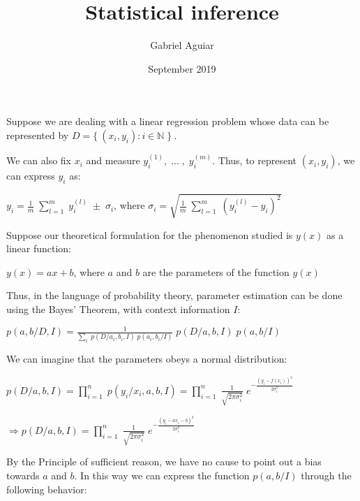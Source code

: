 \documentclass{article}
\title{Statistical inference}
\author{Gabriel Aguiar}
\date{September 2019}
\begin{document}
\maketitle

Suppose we are dealing with a linear regression problem whose data can be represented by $D = \{\ (x_{i},y_{i}) : i \in \mathbb{N} \; \}\ $.

We can also fix $x_{i}$ and measure $y_{i}^{(1)}, \; ... \; , \; y_{i}^{(m)}$. Thus, to represent $(x_{i},y_{i})$, we can express $y_{i}$ as:

\hfill

$y_{i} = \frac{1}{m} \; \sum\limits_{l = 1}^{m} \; y_{i}^{(l)} \; \pm \; \sigma_{i}$, where $\sigma_{i} = \sqrt{\frac{1}{m} \; \sum\limits_{l = 1}^{m} \; (y_{i}^{(l)} - y_{i})^{2}}$

\hfill

Suppose our theoretical formulation for the phenomenon studied is $y(x)$ as a linear function:

\hfill

$y(x) = ax + b$, where $a$ and $b$ are the parameters of the function $y(x)$

\hfill

Thus, in the language of probability theory, parameter estimation can be done using the Bayes' Theorem, with context information $I$:

\hfill

$p(a,b/D,I) = \frac{1}{\sum\limits_{i} \; p(D/a_{i},b_{i},I) \; p(a_{i},b_{i}/I)} \; p(D/a,b,I) \; p(a,b/I)$

\hfill

We can imagine that the parameters obeys a normal distribution:

\hfill

$p(D/a,b,I) = \prod\limits_{i = 1}^{n} \; p(y_{i}/x_{i},a,b,I) = \prod\limits_{i = 1}^{n} \; \frac{1}{\sqrt{2 \pi \sigma_{i}^{2}}} \; e^{-\frac{(y_{i} - f(x_{i}))^{2}}{2 \sigma_{i}^{2}}}$

\hfill

$\Rightarrow p(D/a,b,I) = \prod\limits_{i = 1}^{n} \; \frac{1}{\sqrt{2 \pi \sigma_{i}^{2}}} \; e^{-\frac{(y_{i} - ax_{i} - b)^{2}}{2 \sigma_{i}^{2}}}$

\hfill

By the Principle of sufficient reason, we have no cause to point out a bias towards $a$ and $b$. In this way we can express the function $p(a,b/I)$ through the following behavior:

\hfill
\end{document}
